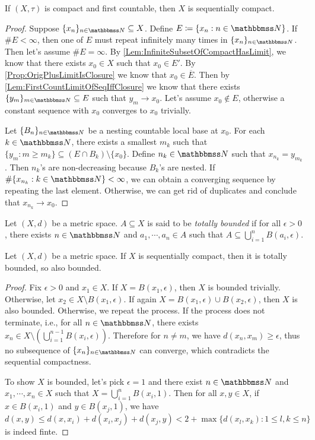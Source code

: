 \documentclass[screen,single]{techreport}
\numberwithin{equation}{section}
\begin{document}
\begin{proposition}\label{Prop:CompactFstCountThenSeqCompact}
	If $(X,\tau)$ is compact and first countable, then $X$ is sequentially compact.
\end{proposition}
\begin{proof}
	Suppose $\{x_n\}_{n \in \bbN} \subseteq X$.
	Define $E \coloneqq \{ x_n : n \in \bbN \}$.
	If $\#E < \infty$, then one of $E$ must repeat infinitely many times in $\{x_n\}_{n \in \bbN}$.
	Then let's assume $\#E = \infty$.
	By \cref{Lem:InfiniteSubsetOfCompactHasLimit}, we know that there exists $x_0 \in X$ such that $x_0 \in E'$.
	By \cref{Prop:OrigPlusLimitIsClosure} we know that $x_0 \in \overline{E}$.
	Then by \cref{Lem:FirstCountLimitOfSeqIffClosure} we know that there exists $\{y_m\}_{m \in \bbN} \subseteq E$ such that $y_m \rightarrow x_0$.
	Let's assume $x_0 \not\in E$, otherwise a constant sequence with $x_0$ converges to $x_0$ trivially.
	
	Let $\{B_n\}_{n \in \bbN}$ be a nesting countable local base at $x_0$.
	For each $k \in \bbN$, there exists a smallest $m_k$ such that $\{ y_m : m \ge m_k\} \subseteq (E \cap B_k) \setminus \{x_0\}$.
	Define $n_k \in \bbN$ such that $x_{n_k} = y_{m_k}$.
	Then $n_k$'s are non-decreasing because $B_k$'s are nested.
	If $\#\{ x_{n_k} : k \in \bbN \} < \infty$, we can obtain a converging sequence by repeating the last element.
	Otherwise, we can get rid of duplicates and conclude that $x_{n_k} \rightarrow x_0$.
\end{proof}

\begin{definition}\label{De:TotallyBoundedness}
	Let $(X,d)$ be a metric space.
	$A \subseteq X$ is said to be \emph{totally bounded} if for all $\epsilon > 0$, there exists $n 	\in \bbN$ and $a_1,\cdots,a_n \in A$ such that $A \subseteq \bigcup_{i=1}^n B(a_i,\epsilon)$.
\end{definition}

\begin{lemma}\label{Lem:MetricSeqCompactIsTotallyBounded}
	Let $(X,d)$ be a metric space.
	If $X$ is sequentially compact, then it is totally bounded, so also bounded.
\end{lemma}
\begin{proof}
	Fix $\epsilon > 0$ and $x_1 \in X$.
	If $X = B(x_1,\epsilon)$, then $X$ is bounded trivially.
	Otherwise, let $x_2 \in X \setminus B(x_1,\epsilon)$.
	If again $X = B(x_1,\epsilon) \cup B(x_2,\epsilon)$, then $X$ is also bounded.
	Otherwise, we repeat the process.
	If the process does not terminate, i.e., for all $n \in \bbN$, there exists $x_n \in X \setminus (\bigcup_{i=1}^{n-1} B(x_i,\epsilon))$.
	Therefore for $n \neq m$, we have $d(x_n,x_m) \ge \epsilon$, thus no subsequence of $\{x_n\}_{n \in \bbN}$ can converge, which contradicts the sequential compactness.
	
	To show $X$ is bounded, let's pick $\epsilon =1$ and there exist $n \in \bbN$ and $x_1,\cdots,x_n \in X$ such that $X = \bigcup_{i=1}^n B(x_i,1)$.
	Then for all $x,y \in X$, if $x \in B(x_i,1)$ and $y \in B(x_j,1)$, we have
	\[
	d(x,y) \le d(x,x_i) + d(x_i,x_j) + d(x_j,y) < 2 + \max\{ d(x_l,x_k): 1 \le l,k \le n \}
	\]
	is indeed finte.
\end{proof}
\end{document}
